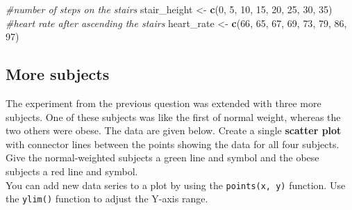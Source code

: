 \documentclass[]{book}
\newenvironment{Shaded}{\begin{snugshade}}{\end{snugshade}}
\newcommand{\CommentTok}[1]{\textcolor[rgb]{0.56,0.35,0.01}{\textit{#1}}}
\newcommand{\DecValTok}[1]{\textcolor[rgb]{0.00,0.00,0.81}{#1}}
\newcommand{\KeywordTok}[1]{\textcolor[rgb]{0.13,0.29,0.53}{\textbf{#1}}}
\newcommand{\NormalTok}[1]{#1}
\newcommand{\StringTok}[1]{\textcolor[rgb]{0.31,0.60,0.02}{#1}}
\begin{document}
\begin{Shaded}
\begin{Highlighting}[]
\CommentTok{#number of steps on the stairs}
\NormalTok{stair_height <-}\StringTok{ }\KeywordTok{c}\NormalTok{(}\DecValTok{0}\NormalTok{, }\DecValTok{5}\NormalTok{, }\DecValTok{10}\NormalTok{, }\DecValTok{15}\NormalTok{, }\DecValTok{20}\NormalTok{, }\DecValTok{25}\NormalTok{, }\DecValTok{30}\NormalTok{, }\DecValTok{35}\NormalTok{)}
\CommentTok{#heart rate after ascending the stairs}
\NormalTok{heart_rate <-}\StringTok{ }\KeywordTok{c}\NormalTok{(}\DecValTok{66}\NormalTok{, }\DecValTok{65}\NormalTok{, }\DecValTok{67}\NormalTok{, }\DecValTok{69}\NormalTok{, }\DecValTok{73}\NormalTok{, }\DecValTok{79}\NormalTok{, }\DecValTok{86}\NormalTok{, }\DecValTok{97}\NormalTok{)}
\end{Highlighting}
\end{Shaded}

\hypertarget{more-subjects}{%
\subsection{More subjects}\label{more-subjects}}

The experiment from the previous question was extended with three more subjects. One of these subjects was like the first of normal weight, whereas the two others were obese. The data are given below. Create a single \textbf{scatter plot} with connector lines between the points showing the data for all four subjects. Give the normal-weighted subjects a green line and symbol and the obese subjects a red line and symbol.\\
You can add new data series to a plot by using the \texttt{points(x,\ y)} function. Use the \texttt{ylim()} function to adjust the Y-axis range.
\end{document}
